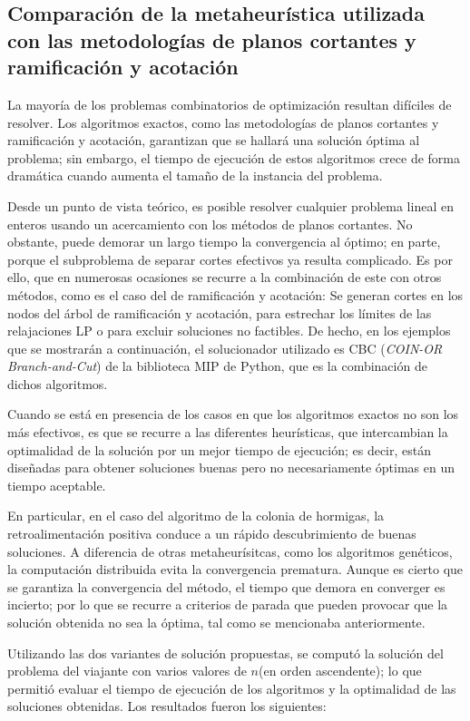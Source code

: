 \documentclass[titlepage, 11pt]{scrartcl}
\begin{document}
 		\subsection{Comparación de la metaheurística utilizada con las metodologías de planos cortantes y ramificación y acotación}
 			La mayoría de los problemas combinatorios de optimización resultan difíciles de resolver. Los algoritmos exactos, como las metodologías de planos cortantes y ramificación y acotación, garantizan que se hallará una solución óptima al problema; sin embargo, el tiempo de ejecución de estos algoritmos crece de forma dramática cuando aumenta el tamaño de la instancia del problema.
 			
 			Desde un punto de vista teórico, es posible resolver cualquier problema lineal en enteros usando un acercamiento con los métodos de planos cortantes. No obstante, puede demorar un largo tiempo la convergencia al óptimo; en parte, porque el subproblema de separar cortes efectivos ya resulta complicado. Es por ello, que en numerosas ocasiones se recurre a la combinación de este con otros métodos, como es el caso del de ramificación y acotación: Se generan cortes en los nodos del árbol de ramificación y acotación, para estrechar los límites de las relajaciones LP o para excluir soluciones no factibles. De hecho, en los ejemplos que se mostrarán a continuación, el solucionador utilizado es CBC (\textit{COIN-OR Branch-and-Cut}) de la biblioteca MIP de Python, que es la combinación de dichos algoritmos.
 			
 			Cuando se está en presencia de los casos en que los algoritmos exactos no son los más efectivos, es que se recurre a las diferentes heurísticas, que intercambian la optimalidad de la solución por un mejor tiempo de ejecución; es decir, están diseñadas para obtener soluciones buenas pero no necesariamente óptimas en un tiempo aceptable. 
 			
 			En particular, en el caso del algoritmo de la colonia de hormigas, la retroalimentación positiva conduce a un rápido descubrimiento de buenas soluciones. A diferencia de otras metaheurísitcas, como los algoritmos genéticos, la computación distribuida evita la convergencia prematura. Aunque es cierto que se garantiza la convergencia del método, el tiempo que demora en converger es incierto; por lo que se recurre a criterios de parada que pueden provocar que la solución obtenida no sea la óptima, tal como se mencionaba anteriormente.
 			
 			Utilizando las dos variantes de solución propuestas, se computó la solución del problema del viajante con varios valores de $n$(en orden ascendente); lo que permitió evaluar el tiempo de ejecución de los algoritmos y la optimalidad de las soluciones obtenidas. Los resultados fueron los siguientes:
 			
\end{document}
